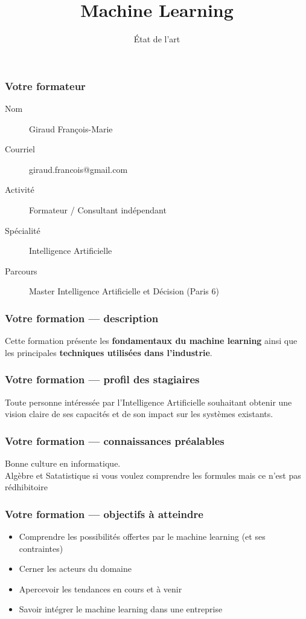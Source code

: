 \documentclass{formation}
\title{Machine Learning}
\subtitle{État de l'art}
\begin{document}
\maketitle

\begin{frame}
  \frametitle{Votre formateur}
  \begin{description}
  \item[Nom] Giraud François-Marie
  \item[Courriel] giraud.francois@gmail.com
  \item[Activité] Formateur / Consultant indépendant
  \item[Spécialité] Intelligence Artificielle
  \item[Parcours] Master Intelligence Artificielle et Décision (Paris 6)
  \end{description}
\end{frame}

\begin{frame}
  \frametitle{Votre formation — description}
  Cette formation présente les \textbf{fondamentaux du machine learning} ainsi que les principales \textbf{techniques utilisées dans l’industrie}.
\end{frame}

\begin{frame}
  \frametitle{Votre formation — profil des stagiaires}
  Toute personne intéressée par l'Intelligence Artificielle souhaitant obtenir une vision claire de ses capacités et de son impact sur les systèmes existants.
\end{frame}

\begin{frame}
  \frametitle{Votre formation — connaissances préalables}
  Bonne culture en informatique. \\
  Algèbre et Satatistique si vous voulez comprendre les formules mais ce n'est pas rédhibitoire
\end{frame}

\begin{frame}
  \frametitle{Votre formation — objectifs à atteindre}
  \begin{itemize}
  \item Comprendre les possibilités offertes par le machine learning (et ses contraintes)
  \item Cerner les acteurs du domaine
  \item Apercevoir les tendances en cours et à venir
  \item Savoir intégrer le machine learning dans une entreprise
  \end{itemize}
\end{frame}
\end{document}
